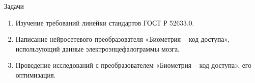 \begin{frame}{Задачи}
	\begin{enumerate}
		\item Изучение требований линейки стандартов ГОСТ Р 52633.0.
		\item Написание нейросетевого преобразователя «Биометрия – код доступа»,
			использующий данные электроэнцефалограммы мозга.
		\item Проведение исследований с преобразователем «Биометрия – код доступа», его оптимизация.
	\end{enumerate}
\end{frame}
